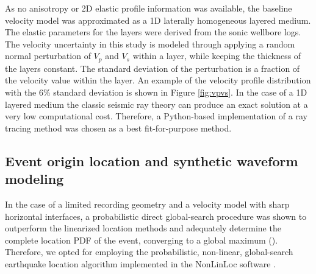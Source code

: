 \documentclass[letterpaper,11pt]{article}
\begin{document}
As no anisotropy or 2D elastic profile information was available, the baseline velocity model was approximated as a 1D laterally homogeneous layered medium. The elastic parameters for the layers were derived from the sonic wellbore logs. The velocity uncertainty in this study is modeled through applying a random normal perturbation of $V_{p}$ and $V_{s}$ within a layer, while keeping the thickness of the layers constant. The standard deviation of the perturbation is a fraction of the velocity value within the layer. An example of the velocity profile distribution with the 6\% standard deviation is shown in Figure \ref{fig:vpvs}. In the case of a 1D layered medium the classic seismic ray theory can produce an exact solution at a very low computational cost. Therefore, a Python-based implementation of a ray tracing method was chosen as a best fit-for-purpose method.



\subsection*{Event origin location and synthetic waveform modeling} %
In the case of a limited recording geometry and a velocity model with sharp horizontal interfaces, a probabilistic direct global-search procedure was shown to outperform the linearized location methods and adequately determine the complete location PDF of the event, converging to a global maximum (\citet{lomax_earthquake_2009}). Therefore, we opted for employing the probabilistic, non-linear, global-search earthquake location algorithm implemented in the NonLinLoc software \cite{lomax_precise_2001}.

\end{document}
